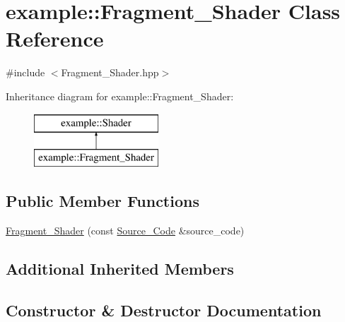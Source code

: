 \hypertarget{classexample_1_1_fragment___shader}{}\section{example\+:\+:Fragment\+\_\+\+Shader Class Reference}
\label{classexample_1_1_fragment___shader}


{\ttfamily \#include $<$Fragment\+\_\+\+Shader.\+hpp$>$}

Inheritance diagram for example\+:\+:Fragment\+\_\+\+Shader\+:\begin{figure}[H]
\begin{center}
\leavevmode
\includegraphics[height=2.000000cm]{classexample_1_1_fragment___shader}
\end{center}
\end{figure}
\subsection*{Public Member Functions}
\begin{DoxyCompactItemize}
\item 
\mbox{\hyperlink{classexample_1_1_fragment___shader_a3950097f56bb66b2bf35ce2942976744}{Fragment\+\_\+\+Shader}} (const \mbox{\hyperlink{classexample_1_1_shader_1_1_source___code}{Source\+\_\+\+Code}} \&source\+\_\+code)
\end{DoxyCompactItemize}
\subsection*{Additional Inherited Members}


\subsection{Constructor \& Destructor Documentation}
\mbox{\label{classexample_1_1_fragment___shader_a3950097f56bb66b2bf35ce2942976744}} 
